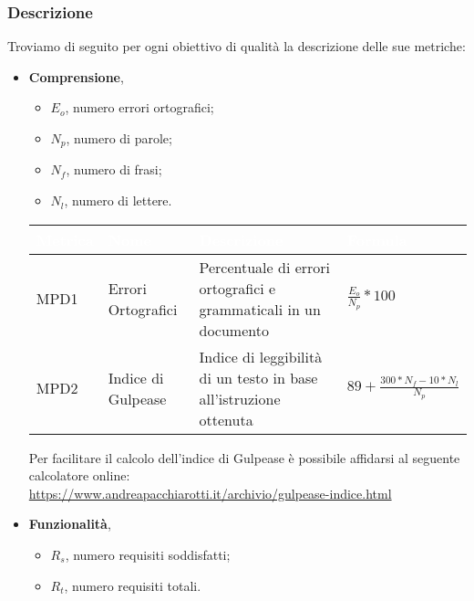    \subsubsection{Descrizione}
   Troviamo di seguito per ogni obiettivo di qualità la descrizione delle sue metriche:
    \begin{itemize}
        \item \textbf{Comprensione},
            \begin{itemize}
                \item $E_o$, numero errori ortografici;
                \item $N_p$, numero di parole;
                \item $N_f$, numero di frasi;
                \item $N_l$, numero di lettere.
            \end{itemize}
            \renewcommand\arraystretch{1,5}
            \begin{center}
                \begin{tabular}{|p{1.7cm}|p{3cm}|p{4.5cm}|p{3cm}|} \hline
                  \rowcolor[HTML]{036400}
                  \textcolor[HTML]{FFFFFF}{\textbf{Metrica}} & \textcolor[HTML]{FFFFFF}{\textbf{Nome}} & \textcolor[HTML]{FFFFFF}{\textbf{Descrizione}} & \textcolor[HTML]{FFFFFF}{\textbf{Formula}}    \\ \hline
                    \rowcolor[HTML]{EFEFEF}
                    MPD1 & Errori Ortografici    & Percentuale di errori ortografici e grammaticali in un documento      & $\frac{E_o}{N_p}*100$        \\ \hline
                    \rowcolor[HTML]{C0C0C0}
                    MPD2 & Indice di Gulpease    & Indice di leggibilità di un testo in base all'istruzione ottenuta   & $89+\frac{300*N_f-10*N_l}{N_p}$     \\ \hline
                \end{tabular}
            \end{center}
            \renewcommand\arraystretch{1}
            Per facilitare il calcolo dell'indice di Gulpease è possibile affidarsi al seguente calcolatore online:\\
            \url{https://www.andreapacchiarotti.it/archivio/gulpease-indice.html}
        \item \textbf{Funzionalità},
            \begin{itemize}
                \item $R_s$, numero requisiti soddisfatti;
                \item $R_t$, numero requisiti totali.

\end{itemize}
\end{itemize}
